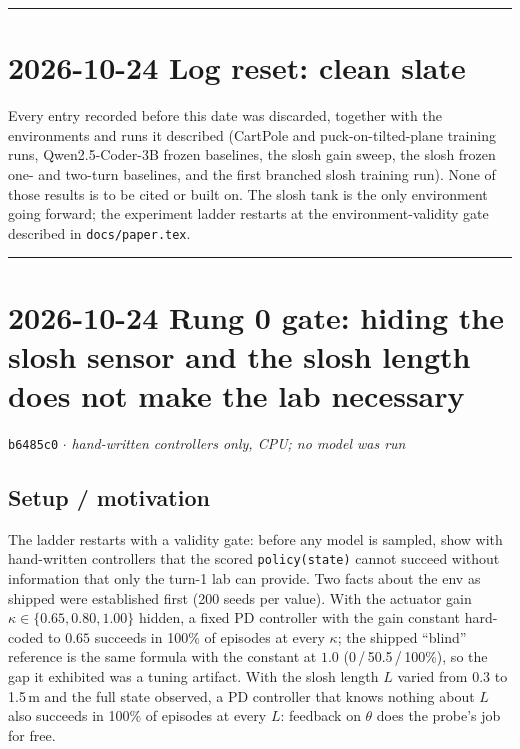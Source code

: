 \documentclass[11pt,a4paper]{article}
\newcommand{\commit}[1]{\texttt{\textcolor{commitgray}{#1}}}
\begin{document}
\bigskip
\hrule
\bigskip

\section*{2026-10-24 \quad Log reset: clean slate}

Every entry recorded before this date was discarded, together with the
environments and runs it described (CartPole and puck-on-tilted-plane
training runs, Qwen2.5-Coder-3B frozen baselines, the slosh gain sweep, the
slosh frozen one- and two-turn baselines, and the first branched slosh
training run). None of those results is to be cited or built on. The slosh
tank is the only environment going forward; the experiment ladder restarts
at the environment-validity gate described in \texttt{docs/paper.tex}.

\bigskip
\hrule
\bigskip

\section*{2026-10-24 \quad Rung 0 gate: hiding the slosh sensor and the slosh
length does not make the lab necessary}

\commit{b6485c0} $\cdot$ \textit{hand-written controllers only, CPU; no model
was run}

\subsection*{Setup / motivation}

The ladder restarts with a validity gate: before any model is sampled, show
with hand-written controllers that the scored \texttt{policy(state)} cannot
succeed without information that only the turn-1 lab can provide. Two facts
about the env as shipped were established first (200 seeds per value). With
the actuator gain $\kappa\in\{0.65,0.80,1.00\}$ hidden, a fixed PD controller
with the gain constant hard-coded to $0.65$ succeeds in 100\% of episodes at
every $\kappa$; the shipped ``blind'' reference is the same formula with the
constant at $1.0$ (0\,/\,50.5\,/\,100\%), so the gap it exhibited was a
tuning artifact. With the slosh length $L$ varied from 0.3 to 1.5\,m and the
full state observed, a PD controller that knows nothing about $L$ also
succeeds in 100\% of episodes at every $L$: feedback on $\theta$ does the
probe's job for free.
\end{document}
